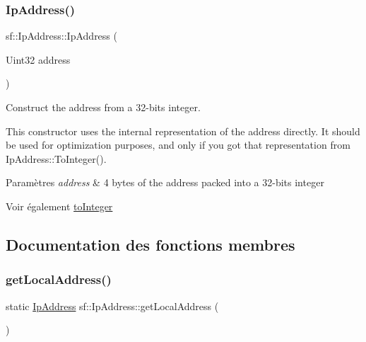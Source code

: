 \subsubsection{\texorpdfstring{Ip\+Address()}{IpAddress()}\hspace{0.1cm}{\footnotesize\ttfamily [5/5]}}
{\footnotesize\ttfamily sf\+::\+Ip\+Address\+::\+Ip\+Address (\begin{DoxyParamCaption}\item[{Uint32}]{address }\end{DoxyParamCaption})\hspace{0.3cm}{\ttfamily [explicit]}}



Construct the address from a 32-\/bits integer. 

This constructor uses the internal representation of the address directly. It should be used for optimization purposes, and only if you got that representation from Ip\+Address\+::\+To\+Integer().


\begin{DoxyParams}{Paramètres}
{\em address} & 4 bytes of the address packed into a 32-\/bits integer\\
\hline
\end{DoxyParams}
\begin{DoxySeeAlso}{Voir également}
\hyperlink{classsf_1_1IpAddress_ae7911c5ea9562f9602c3e29cd54b15e9}{to\+Integer} 
\end{DoxySeeAlso}


\subsection{Documentation des fonctions membres}
\mbox{\label{classsf_1_1IpAddress_a4c31622ad87edca48adbb8e8ed00ee4a}} 
\subsubsection{\texorpdfstring{get\+Local\+Address()}{getLocalAddress()}}
{\footnotesize\ttfamily static \hyperlink{classsf_1_1IpAddress}{Ip\+Address} sf\+::\+Ip\+Address\+::get\+Local\+Address (\begin{DoxyParamCaption}{ }\end{DoxyParamCaption})\hspace{0.3cm}{\ttfamily [static]}}



